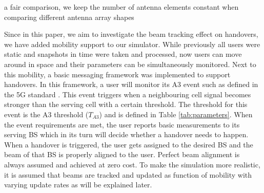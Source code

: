 \documentclass[conference,twocolumn]{IEEEtran}
\begin{document}
a fair comparison, we keep the number of antenna elements constant when comparing different antenna array shapes
\par %
Since in this paper, we aim to investigate the beam tracking effect on handovers, we have added mobility support to our simulator. While previously all users were static and snapshots in time were taken and processed, now users can move around in space and their parameters can be simultaneously monitored. Next to this mobility, a basic messaging framework was implemented to support handovers. In this framework, a user will monitor its A3 event such as defined in the 5G standard \cite{3gpp.38.331}. This event triggers when a neighbouring cell signal becomes stronger than the serving cell with a certain threshold. The threshold for this event is the A3 threshold ($T_{A3}$) and is defined in Table \ref{tab:parameters}. When the event requirements are met, the user reports basic measurements to its serving BS which in its turn will decide whether a handover needs to happen. When a handover is triggered, the user gets assigned to the desired BS and the beam of that BS is properly aligned to the user. Perfect beam alignment is always assumed and achieved at zero cost. To make the simulation more realistic, it is assumed that beams are tracked and updated as function of mobility with varying update rates as will be explained later. 
\end{document}
